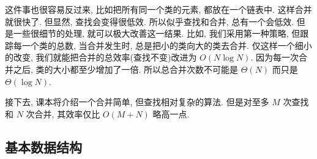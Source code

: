 \documentclass[a4paper]{ctexart}
\theoremstyle{definition}
\theoremstyle{definition}
\begin{document}
这件事也很容易反过来, 比如把所有同一个类的元素, 都放在一个链表中. 这样合并就很快了. 
但显然, 查找会变得很低效. 所以似乎查找和合并, 总有一个会低效. 但是一些很细节的处理, 
就可以极大改善这一结果. 比如, 我们采用第一种策略, 但跟踪每一个类的总数, 当合并发生时, 
总是把小的类向大的类去合并. 仅这样一个细小的改变, 我们就能把合并的总效率(查找不变)改进为 $O(N\log N)$.
因为每一次合并之后, 类的大小都至少增加了一倍. 所以总合并次数不可能是 $\Theta(N)$ 而只是 $\Theta(\log N)$. 

接下去, 课本将介绍一个合并简单, 但查找相对复杂的算法. 但是对至多 $M$ 次查找和 $N$ 次合并, 
其效率仅比 $O(M + N)$ 略高一点.

\subsection{基本数据结构}
\end{document}
